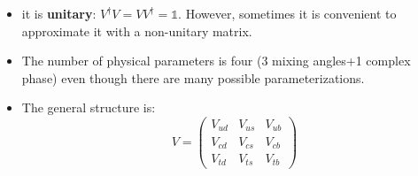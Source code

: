 \documentclass[../main.tex]{subfiles}
\begin{document}
\begin{itemize}
    \item it is \textbf{unitary}: $V^\dagger V=VV^\dagger=\mathbb{1}$. However, sometimes it is convenient to approximate it with a non-unitary matrix.
    \item The number of physical parameters is four (3 mixing angles+1 complex phase) even though there are many possible parameterizations.
    \item The general structure is:
    \[
    V=\left(\begin{array}{ccc}
    V_{ud} & V_{us} & V_{ub} \\
    V_{cd} & V_{cs} & V_{cb} \\
    V_{td} & V_{ts} & V_{tb}
\end{array}\right)
    \]
\end{itemize}
\end{document}
